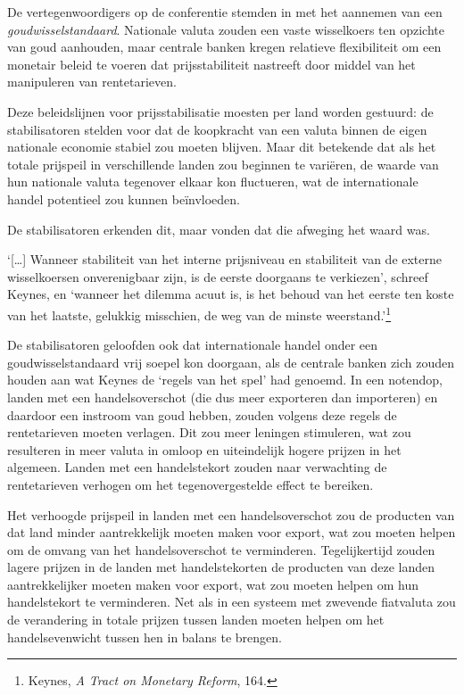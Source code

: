 \documentclass[
  a5paper,
  smalldemyvopaper,11pt,twoside,onecolumn,openright,extrafontsizes,
hidelinks]{memoir}
\begin{document}
De vertegenwoordigers op de conferentie stemden in met het aannemen van
een \emph{goudwisselstandaard}. Nationale valuta zouden een vaste
wisselkoers ten opzichte van goud aanhouden, maar centrale banken kregen
relatieve flexibiliteit om een monetair beleid te voeren dat
prijsstabiliteit nastreeft door middel van het manipuleren van
rentetarieven.

Deze beleidslijnen voor prijsstabilisatie moesten per land worden
gestuurd: de stabilisatoren stelden voor dat de koopkracht van een
valuta binnen de eigen nationale economie stabiel zou moeten blijven.
Maar dit betekende dat als het totale prijspeil in verschillende landen
zou beginnen te variëren, de waarde van hun nationale valuta tegenover
elkaar kon fluctueren, wat de internationale handel potentieel zou
kunnen beïnvloeden.

De stabilisatoren erkenden dit, maar vonden dat die afweging het waard
was.

`{[}\ldots{]} Wanneer stabiliteit van het interne prijsniveau en
stabiliteit van de externe wisselkoersen onverenigbaar zijn, is de
eerste doorgaans te verkiezen', schreef Keynes, en `wanneer het dilemma
acuut is, is het behoud van het eerste ten koste van het laatste,
gelukkig misschien, de weg van de minste weerstand.'\footnote{\hspace{0pt}Keynes,
  \emph{A Tract on Monetary Reform}, 164.}

De stabilisatoren geloofden ook dat internationale handel onder een
goudwisselstandaard vrij soepel kon doorgaan, als de centrale banken
zich zouden houden aan wat Keynes de `regels van het spel' had genoemd.
In een notendop, landen met een handelsoverschot (die dus meer
exporteren dan importeren) en daardoor een instroom van goud hebben,
zouden volgens deze regels de rentetarieven moeten verlagen. Dit zou
meer leningen stimuleren, wat zou resulteren in meer valuta in omloop en
uiteindelijk hogere prijzen in het algemeen. Landen met een
handelstekort zouden naar verwachting de rentetarieven verhogen om het
tegenovergestelde effect te bereiken.

Het verhoogde prijspeil in landen met een handelsoverschot zou de
producten van dat land minder aantrekkelijk moeten maken voor export,
wat zou moeten helpen om de omvang van het handelsoverschot te
verminderen. Tegelijkertijd zouden lagere prijzen in de landen met
handelstekorten de producten van deze landen aantrekkelijker moeten
maken voor export, wat zou moeten helpen om hun handelstekort te
verminderen. Net als in een systeem met zwevende fiatvaluta zou de
verandering in totale prijzen tussen landen moeten helpen om het
handelsevenwicht tussen hen in balans te brengen.
\end{document}
